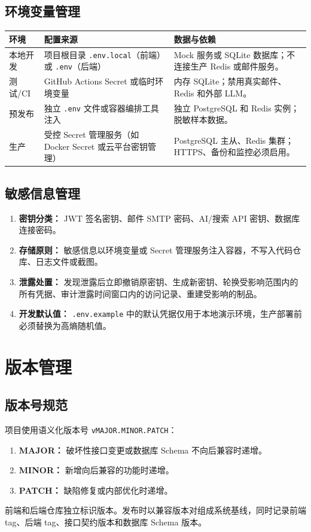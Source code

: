 \documentclass[12pt,a4paper]{ctexart}
\begin{document}
\subsection{环境变量管理}
\begin{center}
\begin{tabularx}{0.9\textwidth}{p{2.8cm}p{5.5cm}p{5.5cm}}
\toprule 环境 & 配置来源 & 数据与依赖 \\\midrule
本地开发 & 项目根目录 \texttt{.env.local}（前端）或 \texttt{.env}（后端） & Mock 服务或 SQLite 数据库；不连接生产 Redis 或邮件服务。 \\
测试/CI & GitHub Actions Secret 或临时环境变量 & 内存 SQLite；禁用真实邮件、Redis 和外部 LLM。 \\
预发布 & 独立 \texttt{.env} 文件或容器编排工具注入 & 独立 PostgreSQL 和 Redis 实例；脱敏样本数据。 \\
生产 & 受控 Secret 管理服务（如 Docker Secret 或云平台密钥管理） & PostgreSQL 主从、Redis 集群；HTTPS、备份和监控必须启用。 \\
\bottomrule
\end{tabularx}
\end{center}

\subsection{敏感信息管理}
\begin{enumerate}
\item \textbf{密钥分类：} JWT 签名密钥、邮件 SMTP 密码、AI/搜索 API 密钥、数据库连接密码。
\item \textbf{存储原则：} 敏感信息以环境变量或 Secret 管理服务注入容器，不写入代码仓库、日志文件或截图。
\item \textbf{泄露处置：} 发现泄露后立即撤销原密钥、生成新密钥、轮换受影响范围内的所有凭据、审计泄露时间窗口内的访问记录、重建受影响的制品。
\item \textbf{开发默认值：} \texttt{.env.example} 中的默认凭据仅用于本地演示环境，生产部署前必须替换为高熵随机值。
\end{enumerate}

\section{版本管理}
\subsection{版本号规范}
项目使用语义化版本号 \texttt{vMAJOR.MINOR.PATCH}：
\begin{enumerate}
\item \textbf{MAJOR：} 破坏性接口变更或数据库 Schema 不向后兼容时递增。
\item \textbf{MINOR：} 新增向后兼容的功能时递增。
\item \textbf{PATCH：} 缺陷修复或内部优化时递增。
\end{enumerate}
前端和后端仓库独立标识版本。发布时以兼容版本对组成系统基线，同时记录前端 tag、后端 tag、接口契约版本和数据库 Schema 版本。
\end{document}
